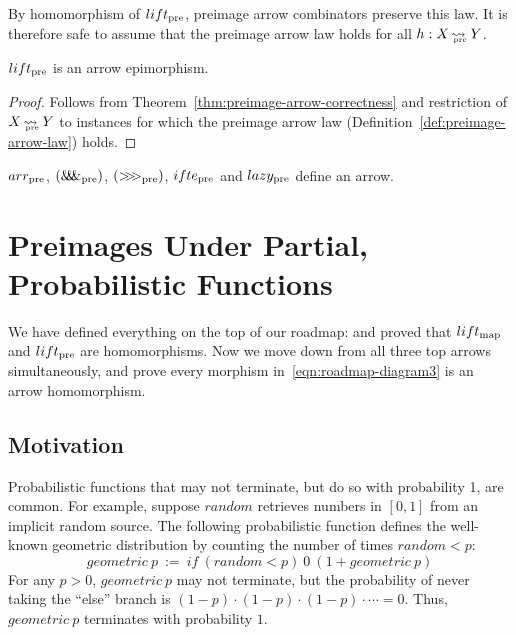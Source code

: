 By homomorphism of $lift_\mathrm{pre}$, preimage arrow combinators preserve this law.
It is therefore safe to assume that the preimage arrow law holds for all $h : X \operatorname{\rightsquigarrow_{\mspace{-19mu}_\mathrm{pre}}} Y$.

\begin{theorem}
$lift_\mathrm{pre}$ is an arrow epimorphism.
\end{theorem}
\begin{proof}
Follows from Theorem~\ref{thm:preimage-arrow-correctness} and restriction of $X \operatorname{\rightsquigarrow_{\mspace{-19mu}_\mathrm{pre}}} Y$ to instances for which the preimage arrow law (Definition~\ref{def:preimage-arrow-law}) holds.
\end{proof}

\begin{corollary}
$arr_\mathrm{pre}$, $(\mathit{\&\mspace{-7.5mu}\&\mspace{-7.5mu}\&}_\mathrm{pre})$, $({>}\mspace{-6mu}{>}\mspace{-6mu}{>}_\mathrm{pre})$, $ifte_\mathrm{pre}$ and $lazy_\mathrm{pre}$ define an arrow.
\end{corollary}


\section{Preimages Under Partial, Probabilistic Functions}

We have defined everything on the top of our roadmap:
and proved that $lift_\mathrm{map}$ and $lift_\mathrm{pre}$ are homomorphisms.
Now we move down from all three top arrows simultaneously, and prove every morphism in~\eqref{eqn:roadmap-diagram3} is an arrow homomorphism.

\subsection{Motivation}

Probabilistic functions that may not terminate, but do so with probability 1, are common.
For example, suppose $random$ retrieves numbers in $[0,1]$ from an implicit random source.
The following probabilistic function defines the well-known geometric distribution by counting the number of times $random < p$:
\begin{equation}
	geometric~p \ := \ if~(random < p)~0~(1 + geometric~p)
\label{eqn:geometric-def}
\end{equation}
For any $p > 0$, $geometric~p$ may not terminate, but the probability of never taking the ``else'' branch is $(1-p) \cdot (1-p) \cdot (1-p) \cdot \cdots = 0$. Thus, $geometric~p$ terminates with probability $1$.

